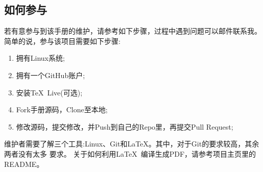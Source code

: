 \subsection{如何参与}
若有意参与到该手册的维护，请参考如下步骤，过程中遇到问题可以邮件联系我。
简单的说，参与该项目需要如下步骤:
\begin{enumerate}
\item 拥有Linux系统;
\item 拥有一个GitHub账户;
\item 安装\TeX~Live(可选);
\item Fork手册源码，Clone至本地;
\item 修改源码，提交修改，并Push到自己的Repo里，再提交Pull Request;
\end{enumerate}
维护者需要了解三个工具:Linux、Git和\LaTeX。其中，对于Git的要求较高，其余两者没有太多
要求。
关于如何利用\LaTeX~编译生成PDF，请参考项目主页里的README。
